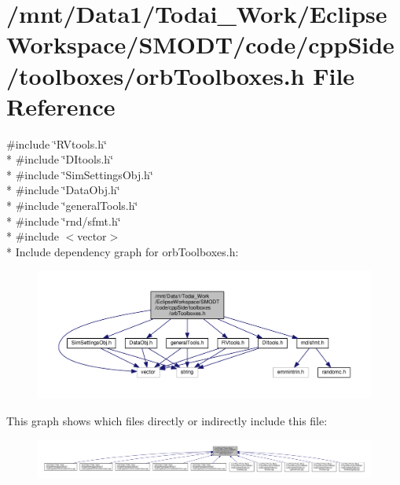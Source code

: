 \section{/mnt/\-Data1/\-Todai\-\_\-\-Work/\-Eclipse\-Workspace/\-S\-M\-O\-D\-T/code/cpp\-Side/toolboxes/orb\-Toolboxes.h File Reference}
\label{orb_toolboxes_8h}
{\ttfamily \#include \char`\"{}R\-Vtools.\-h\char`\"{}}\\*
{\ttfamily \#include \char`\"{}D\-Itools.\-h\char`\"{}}\\*
{\ttfamily \#include \char`\"{}Sim\-Settings\-Obj.\-h\char`\"{}}\\*
{\ttfamily \#include \char`\"{}Data\-Obj.\-h\char`\"{}}\\*
{\ttfamily \#include \char`\"{}general\-Tools.\-h\char`\"{}}\\*
{\ttfamily \#include \char`\"{}rnd/sfmt.\-h\char`\"{}}\\*
{\ttfamily \#include $<$vector$>$}\\*
Include dependency graph for orb\-Toolboxes.\-h\-:
\nopagebreak
\begin{figure}[H]
\begin{center}
\leavevmode
\includegraphics[width=350pt]{orb_toolboxes_8h__incl}
\end{center}
\end{figure}
This graph shows which files directly or indirectly include this file\-:
\nopagebreak
\begin{figure}[H]
\begin{center}
\leavevmode
\includegraphics[width=350pt]{orb_toolboxes_8h__dep__incl}
\end{center}
\end{figure}
